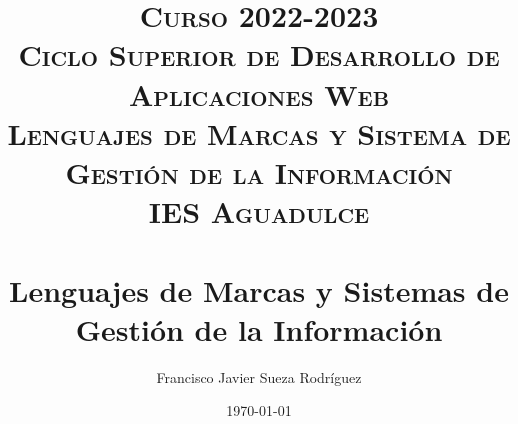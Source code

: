 


\title{
\normalfont \normalsize
\textsc{{\bfseries Curso 2022-2023} \\ Ciclo Superior de Desarrollo de Aplicaciones Web \\  Lenguajes de Marcas y Sistema de Gestión de la Información \\ IES Aguadulce} \\
[25pt]
\horrule{0.5pt} \\[0.4cm]
\huge Lenguajes de Marcas y Sistemas de Gestión de la Información
\horrule{0.5pt} \\[0.4cm]
}

\author{Francisco Javier Sueza Rodríguez}
\date{\normalsize\today}




\maketitle

\newpage

\tableofcontents



\newpage



\newpage
{}



